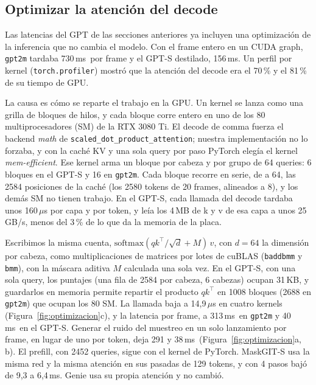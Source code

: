 \documentclass[10pt,twocolumn,a4paper]{article}
\DeclareRobustCommand{\editado}[1]{\textcolor{editado}{#1}}
\DeclareRobustCommand{\editado}[1]{#1}
\newcommand{\ms}{\,ms}
\begin{document}
\subsection{\texorpdfstring{\editado{Optimizar la atención del decode}}{Optimizar la atención del decode}}
\label{sec:optimizacion}

\editado{Las latencias del GPT de las secciones anteriores ya incluyen una optimización de la inferencia que no cambia el modelo. Con el frame entero en un CUDA graph, \texttt{gpt2m} tardaba 730\ms\ por frame y el GPT-S destilado, 156\ms. Un perfil por kernel (\texttt{torch.profiler}) mostró que la atención del decode era el 70\,\% y el 81\,\% de su tiempo de GPU.}

\editado{La causa es cómo se reparte el trabajo en la GPU. Un kernel se lanza como una grilla de bloques de hilos, y cada bloque corre entero en uno de los 80 multiprocesadores (SM) de la RTX 3080 Ti. El decode de comma fuerza el backend \emph{math} de \texttt{scaled\_dot\_product\_attention}; nuestra implementación no lo forzaba, y con la caché KV y una sola query por paso PyTorch elegía el kernel \emph{mem-efficient}. Ese kernel arma un bloque por cabeza y por grupo de 64 queries: 6 bloques en el GPT-S y 16 en \texttt{gpt2m}. Cada bloque recorre en serie, de a 64, las 2584 posiciones de la caché (los 2580 tokens de 20 frames, alineados a 8), y los demás SM no tienen trabajo. En el GPT-S, cada llamada del decode tardaba unos 160\,$\mu$s por capa y por token, y leía los 4\,MB de k y v de esa capa a unos 25\,GB/s, menos del 3\,\% de lo que da la memoria de la placa.}

\editado{Escribimos la misma cuenta, $\mathrm{softmax}(qk^\top/\sqrt{d} + M)\,v$, con $d=64$ la dimensión por cabeza, como multiplicaciones de matrices por lotes de cuBLAS (\texttt{baddbmm} y \texttt{bmm}), con la máscara aditiva $M$ calculada una sola vez. En el GPT-S, con una sola query, los puntajes (una fila de 2584 por cabeza, 6 cabezas) ocupan 31\,KB, y guardarlos en memoria permite repartir el producto $qk^\top$ en 1008 bloques (2688 en \texttt{gpt2m}) que ocupan los 80 SM. La llamada baja a 14,9\,$\mu$s en cuatro kernels (Figura~\ref{fig:optimizacion}c), y la latencia por frame, a 313\ms\ en \texttt{gpt2m} y 40\ms\ en el GPT-S. Generar el ruido del muestreo en un solo lanzamiento por frame, en lugar de uno por token, deja 291 y 38\ms\ (Figura~\ref{fig:optimizacion}a, b). El prefill, con 2452 queries, sigue con el kernel de PyTorch. MaskGIT-S usa la misma red y la misma atención en sus pasadas de 129 tokens, y con 4 pasos bajó de 9,3 a 6,4\ms. Genie usa su propia atención y no cambió.}
\end{document}
